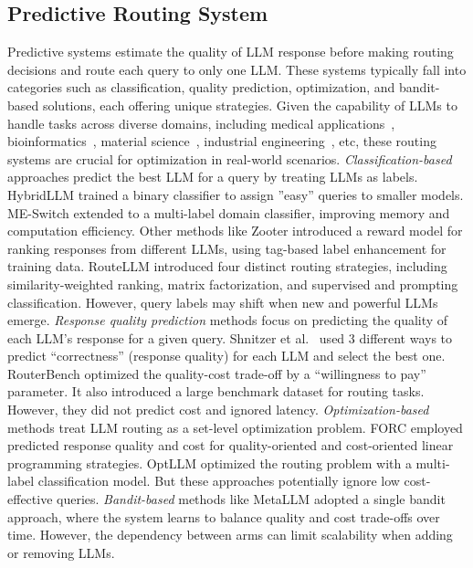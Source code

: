 \subsection{Predictive Routing System}
Predictive systems estimate the quality of LLM response before making routing decisions and route each query to only one LLM. These systems typically fall into categories such as classification, quality prediction, optimization, and bandit-based solutions, each offering unique strategies. Given the capability of LLMs to handle tasks across diverse domains, including medical applications~\cite{liu2024calorie,liu2025calorie}, bioinformatics~\cite{ying2024revolutionizing,liu2024pth}, material science~\cite{hu2024reinforcement}, industrial engineering~\cite{xie2025transformer,xie2024spatio}, etc, these routing systems are crucial for optimization in real-world scenarios.
\textit{Classification-based} approaches predict the best LLM for a query by treating LLMs as labels.
HybridLLM \cite{ding2024hybrid} trained a binary classifier to assign ''easy'' queries to smaller models. ME-Switch \cite{liu2024me} extended to a multi-label domain classifier, improving memory and computation efficiency. Other methods like Zooter \cite{lu-etal-2024-routing} introduced a reward model for ranking responses from different LLMs, using tag-based label enhancement for training data. RouteLLM \cite{ong2024routellm} introduced four distinct routing strategies, including similarity-weighted ranking, matrix factorization, and supervised and prompting classification. However, query labels may shift when new and powerful LLMs emerge.
\textit{Response quality prediction} methods focus on predicting the quality of each LLM's response for a given query.
Shnitzer et al.~\cite{shnitzer2023large} used 3 different ways to predict ``correctness'' (response quality) for each LLM and select the best one. RouterBench \cite{hu2024routerbench} optimized the quality-cost trade-off by a ``willingness to pay'' parameter. It also introduced a large benchmark dataset for routing tasks. However, they did not predict cost and ignored latency. 
\textit{Optimization-based} methods treat LLM routing as a set-level optimization problem. 
FORC \cite{vsakota2024fly} employed predicted response quality and cost for quality-oriented and cost-oriented linear programming strategies.
OptLLM \cite{liu2024optllm} optimized the routing problem with a multi-label classification model.
But these approaches potentially ignore low cost-effective queries.
\textit{Bandit-based} methods like MetaLLM \cite{nguyen2024metallm} adopted a single bandit approach, where the system learns to balance quality and cost trade-offs over time. However, the dependency between arms can limit scalability when adding or removing LLMs.